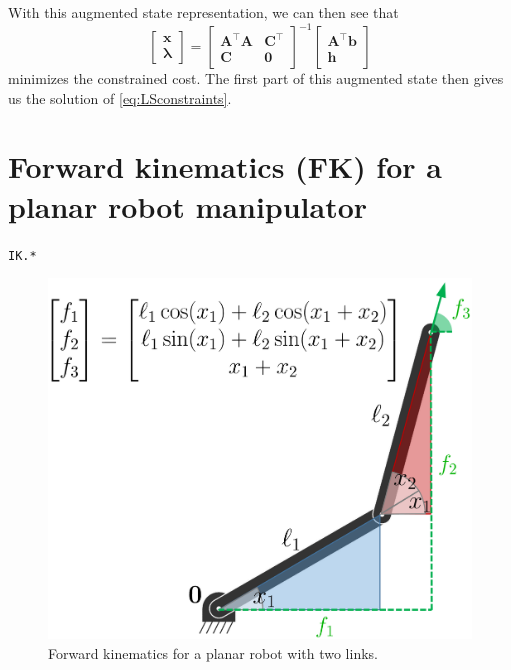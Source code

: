 \documentclass[10pt,a4paper]{article} %
\newcommand{\trsp}{{\scriptscriptstyle\top}}
\newcommand{\filename}[1]{\colorbox{rr2}{\color{white}\texttt{#1}}}
\begin{document}
With this augmented state representation, we can then see that 
\begin{equation*}
	\begin{bmatrix} \bm{x} \\ \bm{\lambda} \end{bmatrix} =
	\begin{bmatrix} \bm{A}^\trsp\!\bm{A} & \bm{C}^\trsp \\ \bm{C} & \bm{0} \end{bmatrix}^{-1} \begin{bmatrix} \bm{A}^\trsp\bm{b} \\ \bm{h} \end{bmatrix} 
\end{equation*}
minimizes the constrained cost. The first part of this augmented state then gives us the solution of \eqref{eq:LSconstraints}.


\newpage
\section{Forward kinematics (FK) for a planar robot manipulator}\label{sec:FK}
\begin{flushright}
\filename{IK.*}
\end{flushright}


\begin{figure}
\centering
\includegraphics[width=.34\textwidth]{images/f_ee01.png}
\caption{\footnotesize
Forward kinematics for a planar robot with two links.
}
\label{fig:FK}
\end{figure}
\end{document}
